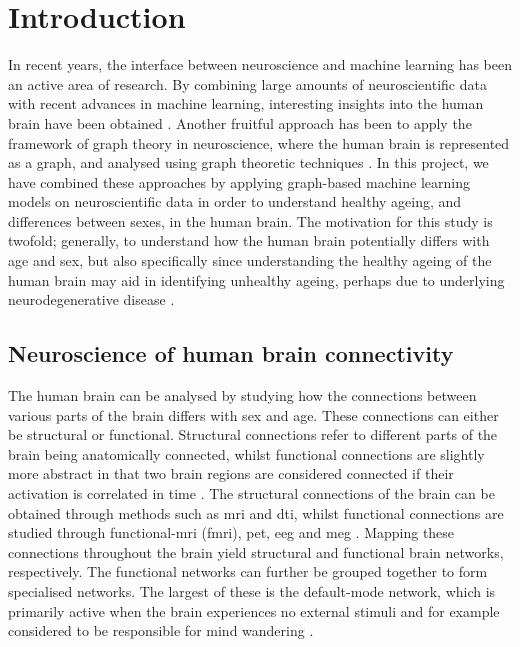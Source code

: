 \chapter{Introduction}

In recent years, the interface between neuroscience and machine learning has been an active area of research. By combining large amounts of neuroscientific data with recent advances in machine learning, interesting insights into the human brain have been obtained \cite{neuro_ml, amoroso_multiplex_age, amoroso_multiplex_ad}. Another fruitful approach has been to apply the framework of graph theory in neuroscience, where the human brain is represented as a graph, and analysed using graph theoretic techniques \cite{chan, braph}. In this project, we have combined these approaches by applying graph-based machine learning models on neuroscientific data in order to understand healthy ageing, and differences between sexes, in the human brain. The motivation for this study is twofold; generally, to understand how the human brain potentially differs with age and sex, but also specifically since understanding the healthy ageing of the human brain may aid in identifying unhealthy ageing, perhaps due to underlying neurodegenerative disease \cite{kaufmann}. 

\section{Neuroscience of human brain connectivity}

The human brain can be analysed by studying how the connections between various parts of the brain differs with sex and age. These connections can either be structural or functional. Structural connections refer to different parts of the brain being anatomically connected, whilst functional connections are slightly more abstract in that two brain regions are considered connected if their activation is correlated in time \cite{sporns}. The structural connections of the brain can be obtained through methods such as \acrshort{mri} and \acrshort{dti}, whilst functional connections are studied through functional-\acrshort{mri} (\acrshort{fmri}), \acrshort{pet}, \acrshort{eeg} and \acrshort{meg} \cite{hirsch}. Mapping these connections throughout the brain yield structural and functional brain networks, respectively. The functional networks can further be grouped together to form specialised networks. The largest of these is the default-mode network, which is primarily active when the brain experiences no external stimuli and for example considered to be responsible for mind wandering \cite{alves_dmn}.

